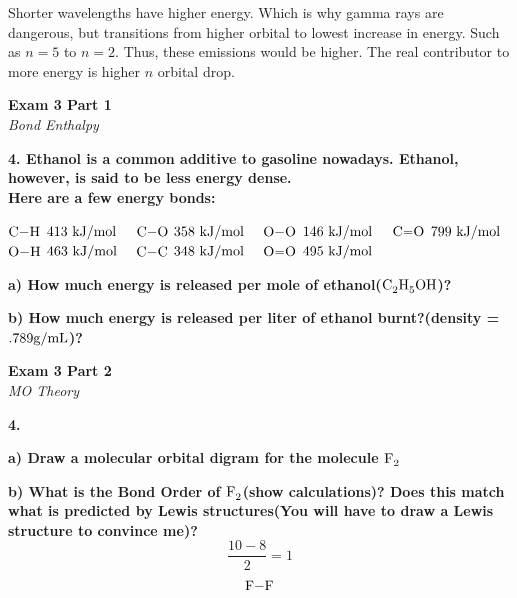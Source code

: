 \documentclass{article}
\begin{document}
    Shorter wavelengths have higher energy. Which is why gamma rays are dangerous, but transitions from higher orbital to lowest increase in energy. Such as $n=5$ to $n=2$. Thus, these emissions would be higher. The real contributor to more energy is higher $n$ orbital drop.

    \pagebreak

    \begin{center}
        \textbf{Exam 3 Part 1}\\
        \textit{Bond Enthalpy}
    \end{center}
    \textbf{4. Ethanol is a common additive to gasoline nowadays. Ethanol, however, is said to be less energy dense.\\ Here are a few energy bonds:}
    \begin{center}
        $\ce{C-H}$ $413 \  \si[per-mode=symbol]{\kilo\joule\per\mol} \quad$
        $\ce{C-O}$ $358 \ \si[per-mode=symbol]{\kilo\joule\per\mol} \quad$
        $\ce{O-O}$ $146 \  \si[per-mode=symbol]{\kilo\joule\per\mol} \quad$
        $\ce{C=O}$ $799 \  \si[per-mode=symbol]{\kilo\joule\per\mol}$\\[.2cm]
        $\ce{O-H}$ $463 \  \si[per-mode=symbol]{\kilo\joule\per\mol} \quad$
        $\ce{C-C}$ $348 \  \si[per-mode=symbol]{\kilo\joule\per\mol} \quad$
        $\ce{O=O}$ $495 \  \si[per-mode=symbol]{\kilo\joule\per\mol}$
    \end{center}

    \textbf{a) How much energy is released per mole of ethanol($\ce{C2H5OH}$)?}

    \textbf{b) How much energy is released per liter of ethanol burnt?(density = $.789 \si[per-mode=symbol]{\gram\per\milli\liter}$)?}
    \pagebreak

    \begin{center}
        \textbf{Exam 3 Part 2}\\
        \textit{MO Theory}
    \end{center}
    \textbf{4.}

    \textbf{a) Draw a molecular orbital digram for the molecule $\ce{F2}$}

    \textbf{b) What is the Bond Order of $\ce{F2}$(show calculations)? Does this match what is predicted by Lewis structures(You will have to draw a Lewis structure to convince me)?}
    $$ \dfrac{10 - 8}{2} = 1$$
    $$ \ce{F-F}$$
\end{document}
